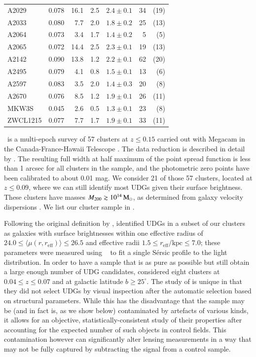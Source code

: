 \documentclass[usenatbib,fleqn]{mnras}
\def\reff{r_\mathrm{eff}}
\begin{document}
\begin{table}
\begin{tabular}{l c r@{ $\pm$ }l c r@{ }r}
A2029      & 0.078 & 16.1 & 2.5 & $2.4\pm0.1$ &  34 & (19) \\
A2033      & 0.080 &  7.7 & 2.0 & $1.8\pm0.2$ &  25 & (13) \\
A2064      & 0.073 &  3.4 & 1.7 & $1.4\pm0.2$ &   5 &  (5) \\
A2065      & 0.072 & 14.4 & 2.5 & $2.3\pm0.1$ &  19 & (13) \\
A2142      & 0.090 & 13.8 & 1.2 & $2.2\pm0.1$ &  62 & (20) \\
A2495      & 0.079 &  4.1 & 0.8 & $1.5\pm0.1$ &  13 &  (6) \\
A2597      & 0.083 &  3.5 & 2.0 & $1.4\pm0.3$ &  20 &  (8) \\
A2670      & 0.076 &  8.5 & 1.2 & $1.9\pm0.1$ &  26 & (11) \\
MKW3S      & 0.045 &  2.6 & 0.5 & $1.3\pm0.1$ &  23 &  (8) \\
ZWCL1215   & 0.077 &  7.7 & 1.7 & $1.9\pm0.1$ &  33 & (11) \\
[0.5ex]
\hline
\end{tabular}
\end{table}

\meneacs\ is a multi-epoch survey of 57 clusters at $z\leq0.15$ carried out with Megacam in the Canada-France-Hawaii Telescope \citep{sand12}. The data reduction is described in detail by \cite{vdburg13,vdburg16}. The resulting full width at half maximum of the point spread function is less than 1 arcsec for all clusters in the sample, and the photometric zero points have been calibrated to about 0.01 mag.
%
We consider 21 of those 57 clusters, located at $z\leq0.09$, where we can still identify most UDGs given their surface brightness. These clusters have masses $M_{200}\gtrsim10^{14}\,\mathrm{M}_\odot$, as determined from galaxy velocity dispersions \citep{sifon15_cccp}. We list our cluster sample in .

Following the original definition by \cite{vandokkum15_coma}, \cite{vdburg16} identified UDGs in a subset of our clusters as galaxies with surface brightnesses within one effective radius of $24.0\leq \langle\mu(r,\reff)\rangle\leq26.5$ and effective radii $1.5\leq\reff/\mathrm{kpc}\leq7.0$; these parameters were measured using \galfit\ \citep{peng02,peng10} to fit a single S\'ersic profile to the light distribution. In order to have a sample that is as pure as possible but still obtain a large enough number of UDG candidates, \cite{vdburg16} considered eight clusters at $0.04\leq z \leq0.07$ and at galactic latitude $b\geq25^\circ$. The study of \cite{vdburg16} is unique in that they did not select UDGs by visual inspection after the automatic selection based on structural parameters. While this has the disadvantage that the sample may be (and in fact is, as we show below) contaminated by artefacts of various kinds, it allows for an objective, statistically-consistent study of their properties after accounting for the expected number of such objects in control fields. This contamination however can significantly alter lensing measurements in a way that may not be fully captured by subtracting the signal from a control sample.
\end{document}
